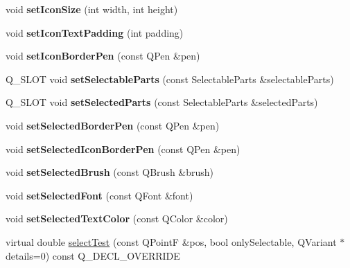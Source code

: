 \begin{DoxyCompactItemize}
\mbox{\label{class_q_c_p_legend_a96b1a37fd4ee6a9778e6e54fe56ab6c2}} 
void {\bfseries set\+Icon\+Size} (int width, int height)
\item 
\mbox{\label{class_q_c_p_legend_a62973bd69d5155e8ea3141366e8968f6}} 
void {\bfseries set\+Icon\+Text\+Padding} (int padding)
\item 
\mbox{\label{class_q_c_p_legend_a2f2c93d18a651f4ff294bb3f026f49b8}} 
void {\bfseries set\+Icon\+Border\+Pen} (const Q\+Pen \&pen)
\item 
\mbox{\label{class_q_c_p_legend_a41a37b92c3af6e48a072eb365bff9a04}} 
Q\+\_\+\+S\+L\+OT void {\bfseries set\+Selectable\+Parts} (const Selectable\+Parts \&selectable\+Parts)
\item 
\mbox{\label{class_q_c_p_legend_a93276fc99fec3c75b25b673a43e33473}} 
Q\+\_\+\+S\+L\+OT void {\bfseries set\+Selected\+Parts} (const Selectable\+Parts \&selected\+Parts)
\item 
\mbox{\label{class_q_c_p_legend_a2c35d262953a25d96b6112653fbefc88}} 
void {\bfseries set\+Selected\+Border\+Pen} (const Q\+Pen \&pen)
\item 
\mbox{\label{class_q_c_p_legend_ade93aabe9bcccaf9cf46cec22c658027}} 
void {\bfseries set\+Selected\+Icon\+Border\+Pen} (const Q\+Pen \&pen)
\item 
\mbox{\label{class_q_c_p_legend_a875227f3219c9799464631dec5e8f1bd}} 
void {\bfseries set\+Selected\+Brush} (const Q\+Brush \&brush)
\item 
\mbox{\label{class_q_c_p_legend_ab580a01c3c0a239374ed66c29edf5ad2}} 
void {\bfseries set\+Selected\+Font} (const Q\+Font \&font)
\item 
\mbox{\label{class_q_c_p_legend_a7674dfc7a1f30e1abd1018c0ed45e0bc}} 
void {\bfseries set\+Selected\+Text\+Color} (const Q\+Color \&color)
\item 
virtual double \hyperlink{class_q_c_p_legend_a9dc868bd95069fad9f40718b7715e100}{select\+Test} (const Q\+PointF \&pos, bool only\+Selectable, Q\+Variant $\ast$details=0) const Q\+\_\+\+D\+E\+C\+L\+\_\+\+O\+V\+E\+R\+R\+I\+DE

\end{DoxyCompactItemize}
